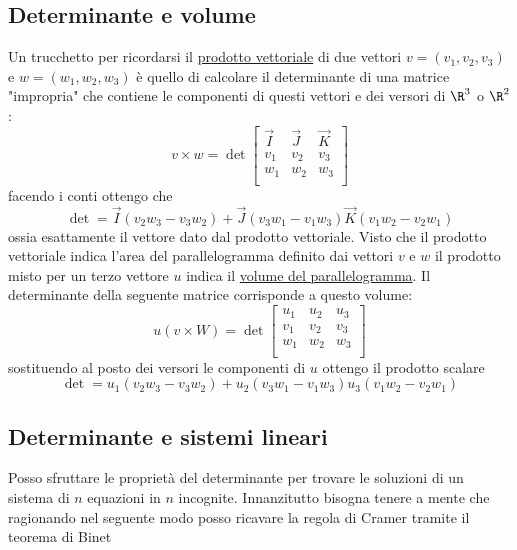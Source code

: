 \documentclass[12pt,a4paper,oneside]{article}
\begin{document}
\subsection{Determinante e volume}
Un trucchetto per ricordarsi il \underline{prodotto vettoriale} di due vettori $ v= \left( v_1,v_2,v_3 \right)  $ e $ w = \left( w_1,w_2,w_3 \right)  $ è quello di calcolare il determinante di una matrice "impropria" che contiene le componenti di questi vettori e dei versori di $ \R^{3} $ o $ \R^{2} $:
\[
	v\times w = \det
	\begin{bmatrix}
		\vec{I} & \vec{J} & \vec{K} \\
		v_1     & v_2     & v_3     \\
		w_1     & w_2     & w_3     \\
	\end{bmatrix}
\]
facendo i conti ottengo che
\[
	\det = \vec{I} \left(  v_2w_3-v_3w_2 \right)  + \vec{J} \left( v_3w_1-v_1w_3 \right) \vec{K}\left( v_1w_2-v_2w_1 \right)
\]
ossia esattamente il vettore dato dal prodotto vettoriale.
\hr
Visto che il prodotto vettoriale indica l'area del parallelogramma definito dai vettori $ v $ e $ w $ il prodotto misto per un terzo vettore $ u $ indica il \underline{volume del parallelogramma}. Il determinante della seguente matrice corrisponde a questo volume:
\[
	u\left( v\times W \right)  = \det
	\begin{bmatrix}
		u_1 & u_2 & u_3 \\
		v_1 & v_2 & v_3 \\
		w_1 & w_2 & w_3 \\
	\end{bmatrix}
\]
sostituendo al posto dei versori le componenti di $ u $ ottengo il prodotto scalare
\[
	\det = u_1\left(  v_2w_3-v_3w_2 \right)  + u_2 \left( v_3w_1-v_1w_3 \right)  u_3\left( v_1w_2-v_2w_1 \right)
\]

\subsection{Determinante e sistemi lineari}
Posso sfruttare le proprietà del determinante per trovare le soluzioni di un sistema di $ n $ equazioni in $ n $ incognite. Innanzitutto bisogna tenere a mente che
ragionando nel seguente modo posso ricavare la regola di Cramer tramite il teorema di Binet
\end{document}
